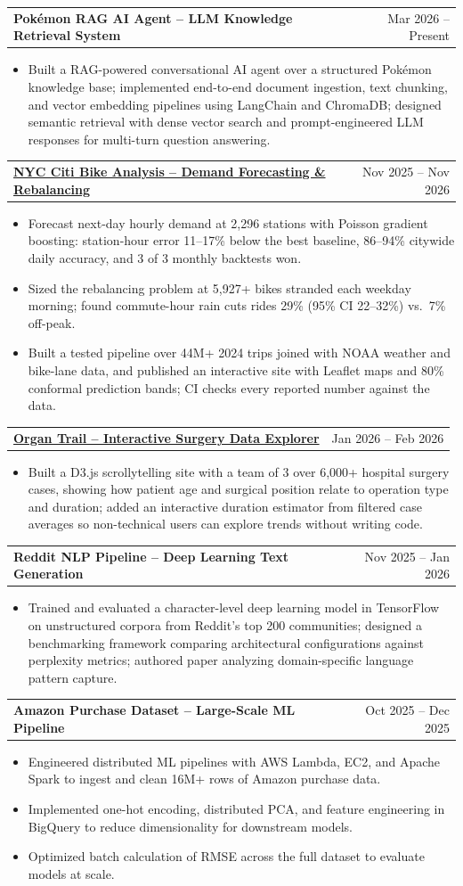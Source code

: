 \documentclass[letterpaper,11pt]{article}
\makeatletter
\newcommand{\resumeItem}[1]{
  \item\small{
    {#1 \vspace{-2pt}}
  }
}
\newcommand{\resumeProjectHeading}[2]{%
  \vspace{-2pt}\item
    \begin{tabular*}{0.97\textwidth}[t]{l@{\extracolsep{\fill}}r}
      \textbf{#1} & #2 \\
    \end{tabular*}\vspace{-7pt}%
}
\newcommand{\resumeItemListStart}{\begin{itemize}}
\newcommand{\resumeItemListEnd}{\end{itemize}\vspace{-7pt}}
\makeatother
\begin{document}
    \resumeProjectHeading{Pokémon RAG AI Agent -- LLM Knowledge Retrieval System}{Mar 2026 -- Present}
      \resumeItemListStart
        \resumeItem{Built a RAG-powered conversational AI agent over a structured Pokémon knowledge base; implemented end-to-end document ingestion, text chunking, and vector embedding pipelines using LangChain and ChromaDB; designed semantic retrieval with dense vector search and prompt-engineered LLM responses for multi-turn question answering.}
      \resumeItemListEnd

    \resumeProjectHeading{\href{https://ancientabacus.github.io/NYC-CitiBike-Analysis/}{NYC Citi Bike Analysis -- Demand Forecasting \& Rebalancing}}{Nov 2025 -- Nov 2026}
      \resumeItemListStart
        \resumeItem{Forecast next-day hourly demand at 2,296 stations with Poisson gradient boosting: station-hour error 11--17\% below the best baseline, 86--94\% citywide daily accuracy, and 3 of 3 monthly backtests won.}
        \resumeItem{Sized the rebalancing problem at 5,927+ bikes stranded each weekday morning; found commute-hour rain cuts rides 29\% (95\% CI 22--32\%) vs.\ 7\% off-peak.}
        \resumeItem{Built a tested pipeline over 44M+ 2024 trips joined with NOAA weather and bike-lane data, and published an interactive site with Leaflet maps and 80\% conformal prediction bands; CI checks every reported number against the data.}
      \resumeItemListEnd

    \resumeProjectHeading{\href{https://ancientabacus.github.io/Project-4/}{Organ Trail -- Interactive Surgery Data Explorer}}{Jan 2026 -- Feb 2026}
    \resumeItemListStart
        \resumeItem{Built a D3.js scrollytelling site with a team of 3 over 6,000+ hospital surgery cases, showing how patient age and surgical position relate to operation type and duration; added an interactive duration estimator from filtered case averages so non-technical users can explore trends without writing code.}
    \resumeItemListEnd

    \resumeProjectHeading{Reddit NLP Pipeline -- Deep Learning Text Generation}{Nov 2025 -- Jan 2026}
      \resumeItemListStart
        \resumeItem{Trained and evaluated a character-level deep learning model in TensorFlow on unstructured corpora from Reddit's top 200 communities; designed a benchmarking framework comparing architectural configurations against perplexity metrics; authored paper analyzing domain-specific language pattern capture.}
      \resumeItemListEnd

    \resumeProjectHeading{Amazon Purchase Dataset -- Large-Scale ML Pipeline}{Oct 2025 -- Dec 2025}
      \resumeItemListStart
        \resumeItem{Engineered distributed ML pipelines with AWS Lambda, EC2, and Apache Spark to ingest and clean 16M+ rows of Amazon purchase data.}
        \resumeItem{Implemented one-hot encoding, distributed PCA, and feature engineering in BigQuery to reduce dimensionality for downstream models.}
        \resumeItem{Optimized batch calculation of RMSE across the full dataset to evaluate models at scale.}
      \resumeItemListEnd
\end{document}
